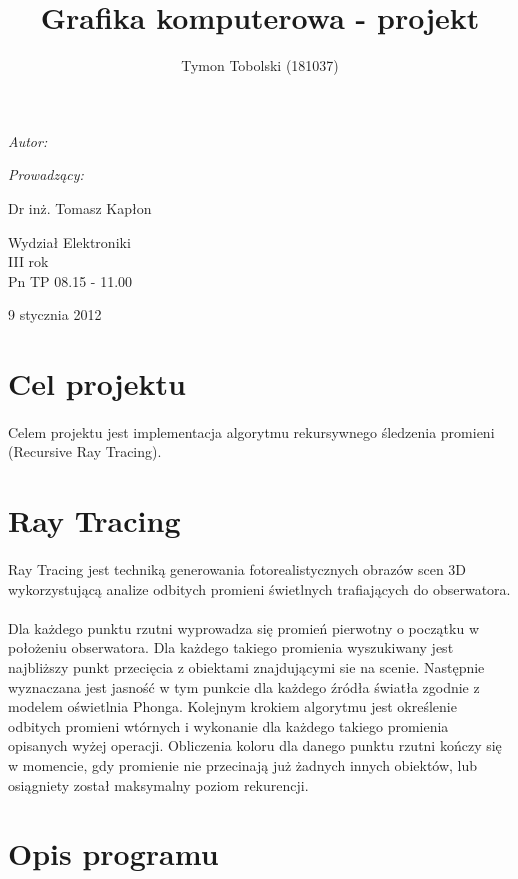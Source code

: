 \documentclass[wide,a4paper,titlepage,12pt] {article}
\title{Grafika komputerowa - projekt}
\author{Tymon Tobolski (181037)}
\makeatletter
\renewcommand{\maketitle}{
\begin{titlepage}
  \begin{center}
    \vspace*{3cm}
    \LARGE \@title \par
    \vspace{2cm}
    \textit{\small Autor:}\par
    \normalsize \@author\par \normalsize
    \vspace{3cm}
    \textit{\small Prowadzący:}\par
    Dr inż. Tomasz Kapłon \par
    \vspace{2cm}
    Wydział Elektroniki\\ III rok\\ Pn TP 08.15 - 11.00\par
    \vspace{4cm}
    \small 9 stycznia 2012
  \end{center}
\end{titlepage}
}
\makeatother
\begin{document}
\maketitle
  \section{Cel projektu}
  \paragraph{}
  Celem projektu jest implementacja algorytmu rekursywnego śledzenia promieni (Recursive Ray Tracing).

  \section{Ray Tracing}
  \paragraph{}
  Ray Tracing jest techniką generowania fotorealistycznych obrazów scen 3D wykorzystującą analize odbitych promieni świetlnych trafiających do obserwatora.
  \paragraph{}
  Dla każdego punktu rzutni wyprowadza się promień pierwotny o początku w położeniu obserwatora. Dla każdego takiego promienia wyszukiwany jest najbliższy punkt przecięcia z obiektami znajdującymi sie na scenie. Następnie wyznaczana jest jasność w tym punkcie dla każdego źródła światła zgodnie z modelem oświetlnia Phonga. Kolejnym krokiem algorytmu jest określenie odbitych promieni wtórnych i wykonanie dla każdego takiego promienia opisanych wyżej operacji. Obliczenia koloru dla danego punktu rzutni kończy się w momencie, gdy promienie nie przecinają już żadnych innych obiektów, lub osiągniety został maksymalny poziom rekurencji.

  \section{Opis programu}
\end{document}
